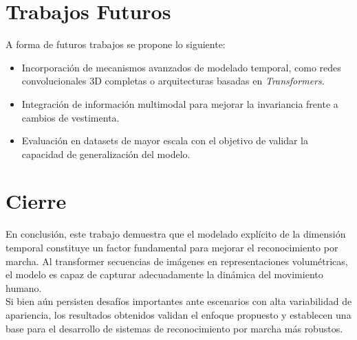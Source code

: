 \section{Trabajos Futuros}

A forma de futuros trabajos se propone lo siguiente:

\begin{itemize}
    \item Incorporación de mecanismos avanzados de modelado temporal, como redes convolucionales 3D completas o arquitecturas basadas en \textit{Transformers}.
    \item Integración de información multimodal para mejorar la invariancia frente a cambios de vestimenta.
    \item Evaluación en datasets de mayor escala con el objetivo de validar la capacidad de generalización del modelo.
\end{itemize}

\section{Cierre}

En conclusión, este trabajo demuestra que el modelado explícito de la dimensión temporal constituye un factor fundamental para mejorar el reconocimiento por marcha. Al transformer secuencias de imágenes en representaciones volumétricas, el modelo es capaz de capturar adecuadamente la dinámica del movimiento humano. \\
Si bien aún persisten desafíos importantes ante escenarios con alta variabilidad de apariencia, los resultados obtenidos validan el enfoque propuesto y establecen una base para el desarrollo de sistemas de reconocimiento por marcha más robustos.